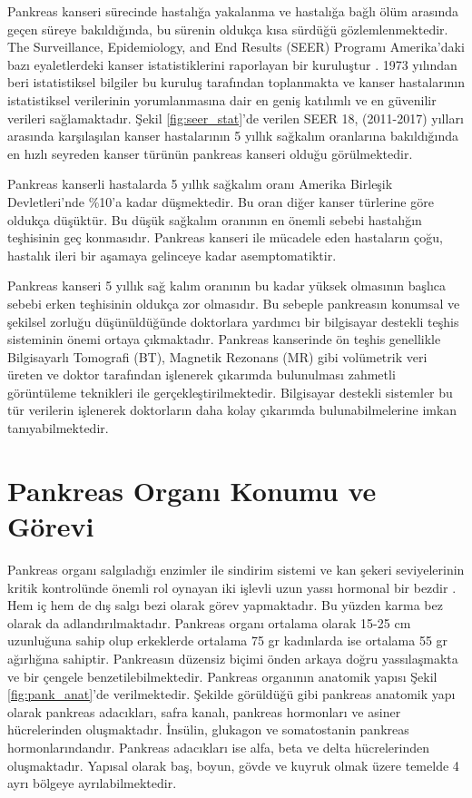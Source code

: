 Pankreas kanseri sürecinde hastalığa yakalanma ve hastalığa bağlı ölüm arasında geçen süreye bakıldığında, bu sürenin oldukça kısa sürdüğü gözlemlenmektedir. The Surveillance, Epidemiology, and End Results (SEER) Programı Amerika'daki bazı eyaletlerdeki kanser istatistiklerini raporlayan bir kuruluştur \cite{pancreasistatisticseer}. 1973 yılından beri istatistiksel bilgiler bu kuruluş tarafından toplanmakta ve kanser hastalarının istatistiksel verilerinin yorumlanmasına dair en geniş katılımlı ve en güvenilir verileri sağlamaktadır. Şekil \ref{fig:seer_stat}'de verilen SEER 18, (2011-2017) yılları arasında karşılaşılan kanser hastalarının 5 yıllık sağkalım oranlarına bakıldığında en hızlı seyreden kanser türünün pankreas kanseri olduğu görülmektedir. 

Pankreas kanserli hastalarda 5 yıllık sağkalım oranı Amerika Birleşik Devletleri'nde \%10’a kadar düşmektedir. Bu oran diğer kanser türlerine göre oldukça düşüktür. Bu düşük sağkalım oranının en önemli sebebi hastalığın teşhisinin geç konmasıdır. Pankreas kanseri ile mücadele eden hastaların çoğu, hastalık ileri bir aşamaya gelinceye kadar asemptomatiktir.

Pankreas kanseri 5 yıllık sağ kalım oranının bu kadar yüksek olmasının başlıca sebebi erken teşhisinin oldukça zor olmasıdır. Bu sebeple pankreasın konumsal ve şekilsel zorluğu düşünüldüğünde doktorlara yardımcı bir bilgisayar destekli teşhis sisteminin önemi ortaya çıkmaktadır. Pankreas kanserinde ön teşhis genellikle Bilgisayarlı Tomografi (BT), Magnetik Rezonans (MR) gibi volümetrik veri üreten ve doktor tarafından işlenerek çıkarımda bulunulması zahmetli görüntüleme teknikleri ile gerçekleştirilmektedir. Bilgisayar destekli sistemler bu tür verilerin işlenerek doktorların daha kolay çıkarımda bulunabilmelerine imkan tanıyabilmektedir.

\section{Pankreas Organı Konumu ve Görevi}
Pankreas organı salgıladığı enzimler ile sindirim sistemi ve kan şekeri seviyelerinin kritik kontrolünde önemli rol oynayan iki işlevli uzun yassı hormonal bir bezdir \cite{bockman1993anatomy}. Hem iç hem de dış salgı bezi olarak görev yapmaktadır. Bu yüzden karma bez olarak da adlandırılmaktadır. Pankreas organı ortalama olarak 15-25 cm uzunluğuna sahip olup erkeklerde ortalama 75 gr kadınlarda ise ortalama 55 gr ağırlığına sahiptir. Pankreasın düzensiz biçimi önden arkaya doğru yassılaşmakta ve bir çengele benzetilebilmektedir. Pankreas organının anatomik yapısı Şekil \ref{fig:pank_anat}'de verilmektedir. Şekilde görüldüğü gibi pankreas anatomik yapı olarak pankreas adacıkları, safra kanalı, pankreas hormonları ve asiner hücrelerinden oluşmaktadır. İnsülin, glukagon ve somatostanin pankreas hormonlarındandır. Pankreas adacıkları ise alfa, beta ve delta hücrelerinden oluşmaktadır. Yapısal olarak baş, boyun, gövde ve kuyruk olmak üzere temelde 4 ayrı bölgeye ayrılabilmektedir. 

